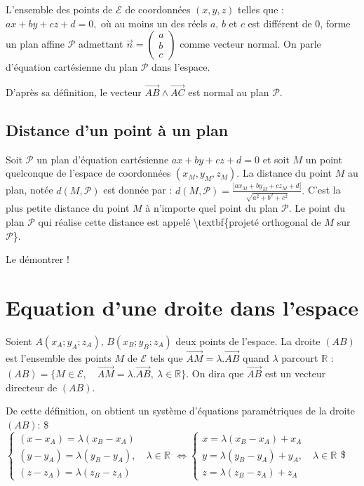 \documentclass[letterpaper,10pt,english]{jupyterBook}
\begin{document}
\sphinxAtStartPar
{}
L’ensemble des points de \(\mathcal{E}\) de coordonnées \((x,y,z)\) telles que :
\(ax+by + cz + d = 0,\)
où au moins un des réels \(a\), \(b\) et \(c\) est différent de 0, forme un plan affine \(\mathcal{P}\) admettant \(\vec{n}=\begin{pmatrix}a \\ b \\ c \end{pmatrix}\) comme vecteur normal. On parle d’équation cartésienne du plan \(\mathcal{P}\) dans l’espace.

\sphinxAtStartPar
{} D’après sa définition, le vecteur \(\vec{AB} \wedge \vec{AC}\) est normal au plan \(\mathcal{P}\).


\subsection{Distance d’un point à un plan}
\label{\detokenize{Part1/Cours:distance-d-un-point-a-un-plan}}
\sphinxAtStartPar
Soit \(\mathcal{P}\) un plan d’équation cartésienne \(ax + by + cz +d =0\) et soit \(M\) un point quelconque de l’espace de coordonnées \((x_M,y_M,z_M)\). La distance du point \(M\) au plan, notée \(d(M,\mathcal{P})\) est donnée par :
\(d(M,\mathcal{P}) = \frac{|ax_M+ by_M + cz_M + d|}{\sqrt{a^2+b^2+c^2}}.\)
C’est la plus petite distance du point \(M\) à n’importe quel point du plan \(\mathcal{P}\). Le point du plan \(\mathcal{P}\) qui réalise cette distance est appelé \textbackslash{}textbf\{projeté orthogonal de \(M\) sur \(\mathcal{P}\)\}.

\sphinxAtStartPar
{} Le démontrer !


\section{Equation d’une droite dans l’espace}
\label{\detokenize{Part1/Cours:equation-d-une-droite-dans-l-espace}}
\sphinxAtStartPar
Soient \(A(x_A;y_A;z_A)\), \(B(x_B;y_B;z_A)\) deux points de l’espace. La droite \((AB)\) est l’ensemble des points \(M\) de \(\mathcal{E}\)  tels que \(\vec{AM} = \lambda .\vec{AB} \) quand \(\lambda\) parcourt \(\mathbb{R}\) :
\((AB) = \{M \in \mathcal{E},\quad \vec{AM} = \lambda. \vec{AB},\ \lambda \in \mathbb{R}\}.\)
On dira que \(\vec{AB}\) est un vecteur directeur de \((AB)\).

\sphinxAtStartPar
De cette définition, on obtient un système d’équations paramétriques de la droite \((AB)\):
\$\(
\left\lbrace\begin{array}{lll}
(x-x_A) = \lambda (x_B-x_A)\\
(y-y_A) = \lambda (y_B-y_A),\quad \lambda \in \mathbb{R}\\
(z-z_A) = \lambda (z_B-z_A)
\end{array}\right. \Leftrightarrow \left\lbrace\begin{array}{lll}
x = \lambda (x_B-x_A) + x_A\\
y = \lambda (y_B-y_A)+ y_A ,\quad \lambda \in \mathbb{R}\\
z = \lambda (z_B-z_A)+ z_A
\end{array}\right. 
\)\$
\end{document}
